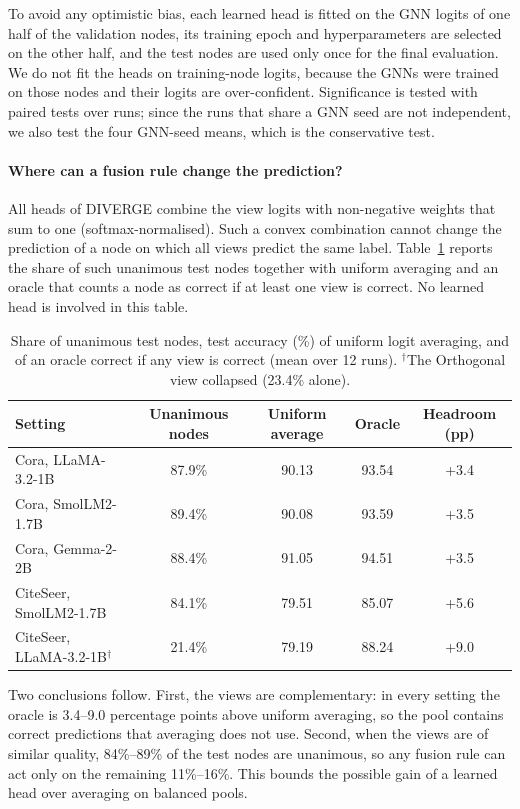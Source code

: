 \documentclass[a4paper,fleqn]{cas-sc}
\DeclareRobustCommand{\revcommon}[2][]{\textcolor{revshared}{#2}} %
\begin{document}
\revcommon[R1,R2,R4]{To avoid any optimistic bias, each learned head is fitted on the GNN logits of one half of the validation nodes, its training epoch and hyperparameters are selected on the other half, and the test nodes are used only once for the final evaluation. We do not fit the heads on training-node logits, because the GNNs were trained on those nodes and their logits are over-confident. Significance is tested with paired tests over runs; since the runs that share a GNN seed are not independent, we also test the four GNN-seed means, which is the conservative test.}

\paragraph{\revcommon{Where can a fusion rule change the prediction?}}
\revcommon[R1,R2,R4]{All heads of DIVERGE combine the view logits with non-negative weights that sum to one (softmax-normalised). Such a convex combination cannot change the prediction of a node on which all views predict the same label. Table~\ref{tab:ens_agreement} reports the share of such unanimous test nodes together with uniform averaging and an oracle that counts a node as correct if at least one view is correct. No learned head is involved in this table.}

\begin{table}[ht]
\centering
\caption{\revcommon[R1,R2,R4]{Share of unanimous test nodes, test accuracy (\%) of uniform logit averaging, and of an oracle correct if any view is correct (mean over 12 runs). $^\dagger$The Orthogonal view collapsed (23.4\% alone).}}
\label{tab:ens_agreement}
\begin{tabular}{l c c c c}
\hline
Setting & Unanimous nodes & Uniform average & Oracle & Headroom (pp) \\
\hline
Cora, LLaMA-3.2-1B        & 87.9\% & 90.13 & 93.54 & +3.4 \\
Cora, SmolLM2-1.7B        & 89.4\% & 90.08 & 93.59 & +3.5 \\
Cora, Gemma-2-2B          & 88.4\% & 91.05 & 94.51 & +3.5 \\
CiteSeer, SmolLM2-1.7B    & 84.1\% & 79.51 & 85.07 & +5.6 \\
CiteSeer, LLaMA-3.2-1B$^\dagger$ & 21.4\% & 79.19 & 88.24 & +9.0 \\
\hline
\end{tabular}
\end{table}

\revcommon[R1,R2,R4]{Two conclusions follow. First, the views are complementary: in every setting the oracle is 3.4--9.0 percentage points above uniform averaging, so the pool contains correct predictions that averaging does not use. Second, when the views are of similar quality, 84\%--89\% of the test nodes are unanimous, so any fusion rule can act only on the remaining 11\%--16\%. This bounds the possible gain of a learned head over averaging on balanced pools.}
\end{document}

